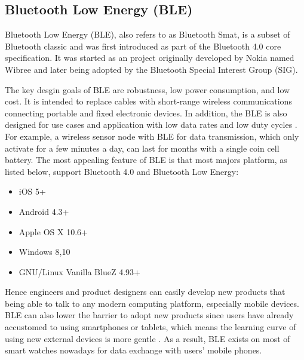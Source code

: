 \subsection{Bluetooth Low Energy (BLE)}
\justify
Bluetooth Low Energy (BLE), also refers to as Bluetooth Smat, is a subset of Bluetooth
classic and was first introduced as part of the Bluetooth 4.0 core specification. It 
was started as an project originally developed by Nokia named Wibree and later being
adopted by the Bluetooth Special Interest Group (SIG). \cite[p.~1]{TCAD14}

\justify
The key desgin goals of BLE are robustness, low power consumption, and low cost. It is
intended to replace cables with short-range wireless communications connecting portable
and fixed electronic devices. In addition, the BLE is also designed for use cases and 
application with low data rates and low duty cycles \cite[p.~180]{Ble19}. 
For example, a wireless sensor node with BLE for data transmission, which only activate 
for a few minutes a day, can last for months with a single coin cell battery. 
The most appealing feature of BLE is that most majors platform, as listed below, support
Bluetooth 4.0 and Bluetooth Low Energy:
\begin{itemize}
    \item iOS 5+
    \item Android 4.3+ 
    \item Apple OS X 10.6+
    \item Windows 8,10 
    \item GNU/Linux Vanilla BlueZ 4.93+
\end{itemize}
Hence engineers and product designers can easily develop new products that being able
to talk to any modern computing platform, especially mobile devices. BLE can also lower
the barrier to adopt new products since users have already accustomed to using 
smartphones or tablets, which means the learning curve of using new external devices 
is more gentle \cite[p.~2]{TCAD14}. As a result, BLE exists on most of smart watches 
nowadays for data exchange with users' mobile phones.  

